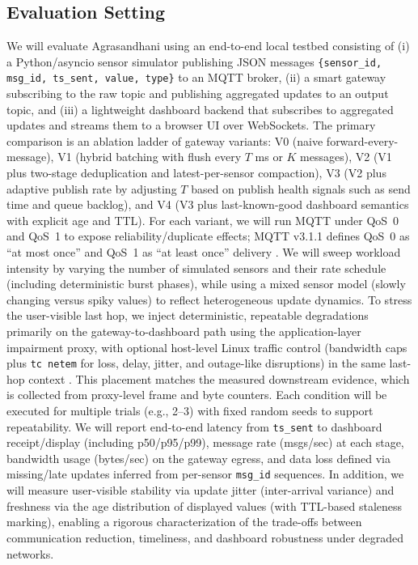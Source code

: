 \subsection{Evaluation Setting}
We will evaluate Agrasandhani using an end-to-end local testbed consisting of (i) a Python/asyncio sensor simulator publishing JSON messages \texttt{\{sensor\_id, msg\_id, ts\_sent, value, type\}} to an MQTT broker, (ii) a smart gateway subscribing to the raw topic and publishing aggregated updates to an output topic, and (iii) a lightweight dashboard backend that subscribes to aggregated updates and streams them to a browser UI over WebSockets. The primary comparison is an ablation ladder of gateway variants: V0 (naive forward-every-message), V1 (hybrid batching with flush every $T$ ms or $K$ messages), V2 (V1 plus two-stage deduplication and latest-per-sensor compaction), V3 (V2 plus adaptive publish rate by adjusting $T$ based on publish health signals such as send time and queue backlog), and V4 (V3 plus last-known-good dashboard semantics with explicit age and TTL). For each variant, we will run MQTT under QoS~0 and QoS~1 to expose reliability/duplicate effects; MQTT v3.1.1 defines QoS~0 as ``at most once'' and QoS~1 as ``at least once'' delivery \cite{mqtt311}. We will sweep workload intensity by varying the number of simulated sensors and their rate schedule (including deterministic burst phases), while using a mixed sensor model (slowly changing versus spiky values) to reflect heterogeneous update dynamics. To stress the user-visible last hop, we inject deterministic, repeatable degradations primarily on the gateway-to-dashboard path using the application-layer impairment proxy, with optional host-level Linux traffic control (bandwidth caps plus \texttt{tc netem} for loss, delay, jitter, and outage-like disruptions) in the same last-hop context \cite{jurgelionis2011_netem_empirical}. This placement matches the measured downstream evidence, which is collected from proxy-level frame and byte counters. Each condition will be executed for multiple trials (e.g., 2--3) with fixed random seeds to support repeatability. We will report end-to-end latency from \texttt{ts\_sent} to dashboard receipt/display (including p50/p95/p99), message rate (msgs/sec) at each stage, bandwidth usage (bytes/sec) on the gateway egress, and data loss defined via missing/late updates inferred from per-sensor \texttt{msg\_id} sequences. In addition, we will measure user-visible stability via update jitter (inter-arrival variance) and freshness via the age distribution of displayed values (with TTL-based staleness marking), enabling a rigorous characterization of the trade-offs between communication reduction, timeliness, and dashboard robustness under degraded networks.

